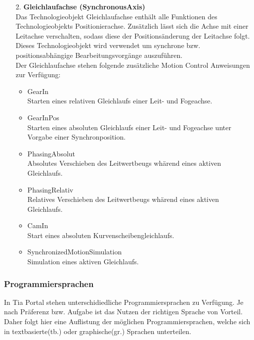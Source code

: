 \begin{itemize}
        \item[2.] \textbf{Gleichlaufachse (SynchronousAxis)} \\
            Das Technologieobjekt Gleichlaufachse enthält alle Funktionen des Technologieobjekts Positionierachse. Zusätzlich lässt sich die Achse mit einer Leitachse verschalten, sodass diese der Positionsänderung der Leitachse folgt. Dieses Technologieobjekt wird verwendet um synchrone bzw. positionsabhängige Bearbeitungsvorgänge auszuführen. \\
            Der Gleichlaufachse stehen folgende zusätzliche Motion Control Anweisungen zur Verfügung:
            \begin{itemize}
                \item GearIn \\
                    Starten eines relativen Gleichlaufs einer Leit- und Fogeachse.
                \item GearInPos \\
                    Starten eines absoluten Gleichlaufs einer Leit- und Fogeachse unter Vorgabe einer Synchronposition.
                \item PhasingAbsolut \\
                    Absolutes Verschieben des Leitwertbeugs whärend eines aktiven Gleichlaufs.
                \item PhasingRelativ \\
                    Relatives Verschieben des Leitwertbeugs whärend eines aktiven Gleichlaufs.
                \item CamIn \\
                    Start eines absoluten Kurvenscheibengleichlaufs.
                \item SynchronizedMotionSimulation \\
                    Simulation eines aktiven Gleichlaufs. 
                    \cite{Technologieobjekte}
            \end{itemize}
             
    \end{itemize}

    \subsubsection{Programmiersprachen}
    In Tia Portal stehen unterschidiedliche Programmiersprachen zu Verfügung. Je nach Präferenz bzw. Aufgabe ist das Nutzen der richtigen Sprache von Vorteil. Daher folgt hier eine Auflistung der möglichen Programmiersprachen, welche sich in textbasierte(tb.) oder graphische(gr.) Sprachen unterteilen. 


